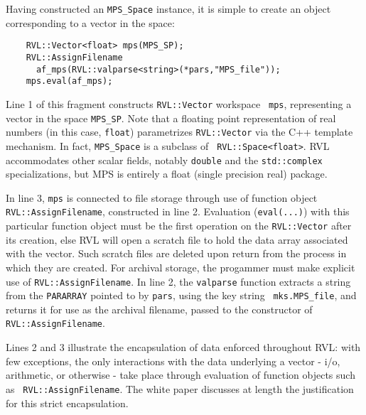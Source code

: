 Having constructed an {\tt MPS\_Space} instance, it is simple to
create an object corresponding to a vector in the space:
{\small
\begin{verbatim}
    RVL::Vector<float> mps(MPS_SP);
    RVL::AssignFilename 
      af_mps(RVL::valparse<string>(*pars,"MPS_file"));
    mps.eval(af_mps);
\end{verbatim}
}
Line 1 of this fragment constructs {\tt RVL::Vector} workspace {\tt
  mps}, representing a vector in the space {\tt MPS\_SP}.
Note that a floating point representation of real numbers (in this
case, {\tt float}) parametrizes {\tt RVL::Vector} via the C++ template
mechanism. In fact, {\tt MPS\_Space} is a subclass of {\tt
  RVL::Space<float>}. RVL accommodates other scalar fields, notably
{\tt double} and the {\tt std::complex} specializations, but MPS is
entirely a float (single precision real) package.

In line 3, {\tt mps} is connected to file storage through use of
function object {\tt RVL::AssignFilename}, constructed in line 2. 
Evaluation ({\tt eval(...)}) with this particular function object must
be the first operation on the {\tt RVL::Vector} after its creation,
else RVL will open a scratch file to hold the data array associated
with the vector. Such scratch files are deleted upon return from the
process in which they are created. For archival storage, the progammer
must make explicit use of {\tt RVL::AssignFilename}.  In line 2, the
{\tt valparse} function extracts a string from the {\tt PARARRAY}
pointed to by {\tt pars}, using the key string {\tt
  mks.MPS\_file}, and returns it for use as the archival filename,
passed to the constructor of {\tt RVL::AssignFilename}.

Lines 2 and 3 illustrate the encapsulation of data enforced throughout
RVL: with few exceptions, the only interactions with the data
underlying a vector - i/o, arithmetic, or otherwise - take place
through evaluation of function objects such as {\tt
  RVL::AssignFilename}. The white paper \cite[]{RVLTOMS} discusses at
length the justification for this strict encapsulation.


